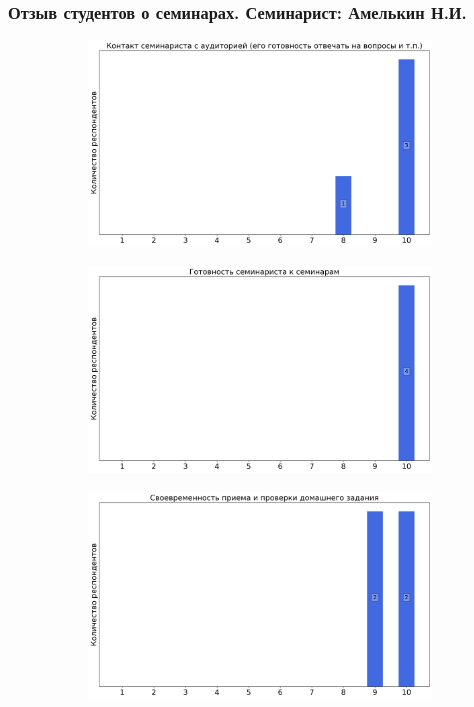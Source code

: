     \subsubsection{Отзыв студентов о семинарах. Семинарист: Амелькин Н.И.}
		\begin{figure}[H]
			\centering
			\begin{subfigure}[b]{0.45\textwidth}
				\centering
				\includegraphics[width=\textwidth]{images/2 course/Аналитическая механика/seminarists-marks-Амелькин Н.И.-0.png}
			\end{subfigure}
			\begin{subfigure}[b]{0.45\textwidth}
				\centering
				\includegraphics[width=\textwidth]{images/2 course/Аналитическая механика/seminarists-marks-Амелькин Н.И.-1.png}
			\end{subfigure}
			\begin{subfigure}[b]{0.45\textwidth}
				\centering
				\includegraphics[width=\textwidth]{images/2 course/Аналитическая механика/seminarists-marks-Амелькин Н.И.-2.png}

\end{subfigure}
\end{figure}
